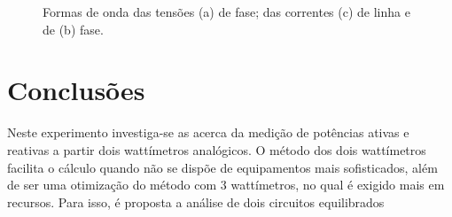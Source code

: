 \documentclass[a4paper,12pt,oneside,openany,table,xcdraw]{article}
\begin{document}
\begin{figure}[H]
\centering
{}


\caption{Formas de onda das tensões (a) de fase; das correntes (c) de linha e de (b) fase.}
\label{m2:simulacao}
\end{figure}

\section{Conclusões} %
Neste experimento investiga-se as acerca da medição de potências ativas e reativas a partir dois wattímetros analógicos. O método dos dois wattímetros facilita o cálculo quando não se dispõe de equipamentos mais sofisticados, além de ser uma otimização do método com 3 wattímetros, no qual é exigido mais em recursos. Para isso, é proposta a análise de dois circuitos equilibrados
\end{document}
